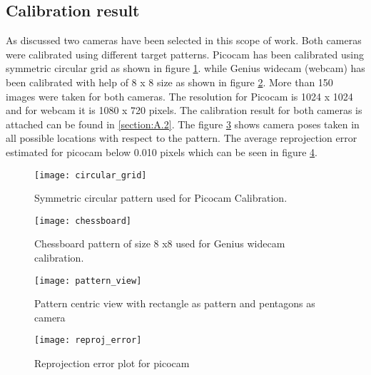 \subsection{Calibration result}
As discussed two cameras have been selected in this scope of work. Both cameras were calibrated using different target patterns. Picocam has been calibrated using symmetric circular grid as shown in figure \ref{fig:circular_grid}. while Genius widecam (webcam) has been calibrated with help of 8 x 8 size as shown in figure \ref{fig:chessboard}. More than 150 images were taken for both cameras. The resolution for Picocam is 1024 x 1024 and for webcam it is 1080 x 720 pixels. The calibration result for both cameras is attached can be found in \ref{section:A.2}. The figure \ref{fig:pattern_view} shows camera poses taken in all possible locations with respect to the pattern. The average reprojection error estimated for picocam below 0.010 pixels which can be seen in figure \ref{fig:reproj}.
\begin{figure}[h]
	\centering
	\texttt{[image: circular\_grid]}
	\caption{Symmetric circular pattern used for Picocam Calibration.}
	\label{fig:circular_grid}
\end{figure}
\begin{figure}[h]
	\centering
	\texttt{[image: chessboard]}
	\caption{Chessboard pattern of size 8 x8 used for Genius widecam calibration.}
	\label{fig:chessboard}
\end{figure}
\begin{figure}[h!]
	\centering
	\texttt{[image: pattern\_view]}
	\caption{Pattern centric view with rectangle as pattern and pentagons as camera}
	\label{fig:pattern_view}
\end{figure}
\begin{figure}[h!]
	\centering
	\texttt{[image: reproj\_error]}
	\caption{Reprojection error plot for picocam}
	\label{fig:reproj}
\end{figure}
